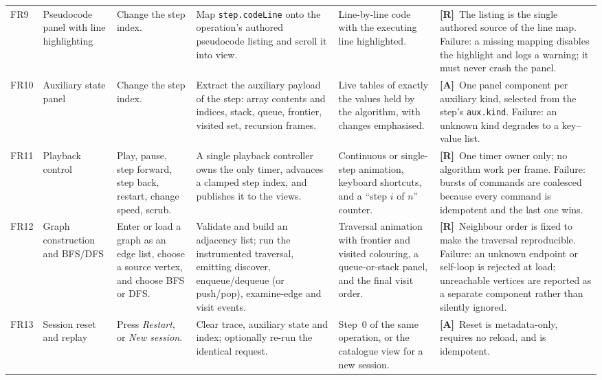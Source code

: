 \documentclass[11pt,a4paper]{article}
\newcommand{\R}{\textcolor{reqc}{\textbf{[R]}}}     %
\newcommand{\A}{\textcolor{asmc}{\textbf{[A]}}}     %
\newcommand{\ct}[1]{\texttt{#1}}
\begin{document}
{\begin{longtable}{@{}L{0.9cm}L{2.4cm}L{3.0cm}L{3.6cm}L{2.6cm}L{2.4cm}@{}}
FR9 & Pseudocode panel with line highlighting &
Change the step index. &
Map \ct{step.codeLine} onto the operation's authored pseudocode listing and scroll it into
view. &
Line-by-line code with the executing line highlighted. &
\R\ The listing is the single authored source of the line map. Failure: a missing mapping
disables the highlight and logs a warning; it must never crash the panel. \\

FR10 & Auxiliary state panel &
Change the step index. &
Extract the auxiliary payload of the step: array contents and indices, stack, queue,
frontier, visited set, recursion frames. &
Live tables of exactly the values held by the algorithm, with changes emphasised. &
\A\ One panel component per auxiliary kind, selected from the step's \ct{aux.kind}.
Failure: an unknown kind degrades to a key--value list. \\

FR11 & Playback control &
Play, pause, step forward, step back, restart, change speed, scrub. &
A single playback controller owns the only timer, advances a clamped step index, and
publishes it to the views. &
Continuous or single-step animation, keyboard shortcuts, and a ``step $i$ of $n$''
counter. &
\R\ One timer owner only; no algorithm work per frame. Failure: bursts of commands are
coalesced because every command is idempotent and the last one wins. \\

FR12 & Graph construction and BFS/DFS &
Enter or load a graph as an edge list, choose a source vertex, and choose BFS or DFS. &
Validate and build an adjacency list; run the instrumented traversal, emitting discover,
enqueue/dequeue (or push/pop), examine-edge and visit events. &
Traversal animation with frontier and visited colouring, a queue-or-stack panel, and the
final visit order. &
\R\ Neighbour order is fixed to make the traversal reproducible. Failure: an unknown
endpoint or self-loop is rejected at load; unreachable vertices are reported as a separate
component rather than silently ignored. \\

FR13 & Session reset and replay &
Press \emph{Restart}, or \emph{New session}. &
Clear trace, auxiliary state and index; optionally re-run the identical request. &
Step~0 of the same operation, or the catalogue view for a new session. &
\A\ Reset is metadata-only, requires no reload, and is idempotent. \\
\end{longtable}
}
\end{document}
